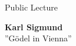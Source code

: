 \documentclass[a4paper]{article}
\begin{document}
\printGenericVSLHeader
\begin{center}
\begin{vsltext}{1.8cm}{2.5cm}
    Public Lecture

    \vspace{1cm}

    \textbf{Karl Sigmund}\\
    ''Gödel in Vienna''

    \vspace{2cm}

    \fontsize{1.2cm}{1.5cm}


\end{vsltext}

\end{center}
\end{document}
